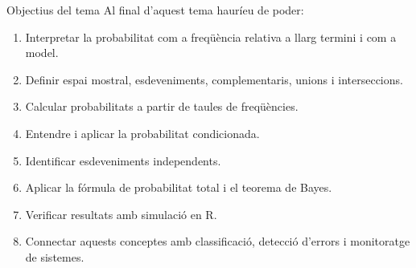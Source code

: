 \documentclass[10pt,aspectratio=169]{beamer}
\newcommand{\R}{\textsf{R}}
\begin{document}
\begin{frame}{Objectius del tema}
Al final d'aquest tema hauríeu de poder:
\begin{enumerate}
  \item Interpretar la probabilitat com a freqüència relativa a llarg termini i com a model.
  \item Definir espai mostral, esdeveniments, complementaris, unions i interseccions.
  \item Calcular probabilitats a partir de taules de freqüències.
  \item Entendre i aplicar la probabilitat condicionada.
  \item Identificar esdeveniments independents.
  \item Aplicar la fórmula de probabilitat total i el teorema de Bayes.
  \item Verificar resultats amb simulació en \R.
  \item Connectar aquests conceptes amb classificació, detecció d'errors i monitoratge de sistemes.
\end{enumerate}
\end{frame}
\end{document}
